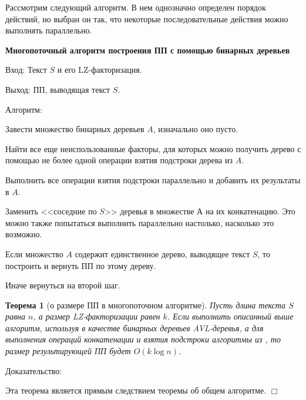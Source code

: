 \documentclass[14pt]{article}
\newtheorem{theorem}{Теорема}[section]
\begin{document}

Рассмотрим следующий алгоритм. В нем однозначно определен порядок действий, но выбран он так, что
некоторые последовательные действия можно выполнять параллельно.

{\bf Многопоточный алгоритм построения ПП с помощью бинарных деревьев}

{\sc Вход:} Текст $S$ и его LZ-факторизация.

{\sc Выход:} ПП, выводящая текст $S$.

{\sc Алгоритм:}
\begin{enumerate}
	\begin{item}
		Завести множество бинарных деревьев $A$, изначально оно пусто.
	\end{item}
	\begin{item}
		Найти все еще неиспользованные факторы, для которых можно получить дерево с помощью не более 
		одной операции взятия подстроки дерева из $A$.
   	\end{item}
   	\begin{item}
   		Выполнить все операции взятия подстроки параллельно и добавить их результаты в $A$.
   	\end{item}
	\begin{item}
		Заменить <<соседние по $S$>> деревья в множестве $А$ на их конкатенацию. Это можно также попытаться
		выполнить параллельно настолько, насколько это возможно.
	\end{item}
	\begin{item}
		Если множество $A$ содержит единственное дерево, выводящее текст $S$, то построить и вернуть ПП по этому дереву.
	\end{item}
	\begin{item}
		Иначе вернуться на второй шаг.
	\end{item}
\end{enumerate}

\begin{theorem}[о размере ПП в многопоточном алгоритме]
	Пусть длина текста $S$ равна $n$, а размер LZ-факторизации равен $k$. Если выполнить описанный выше алгоритм,
	используя в качестве бинарных деревьев AVL-деревья, а для выполнения операций конкатенации и взятия подстроки
	алгоритмы из \cite{RytterSLPConstruction}, то размер результирующей ПП будет $O(k\log n)$.
\end{theorem}

{\sc Доказательство:}

Эта теорема является прямым следствием теоремы об общем алгоритме. $\Box$
\end{document}
